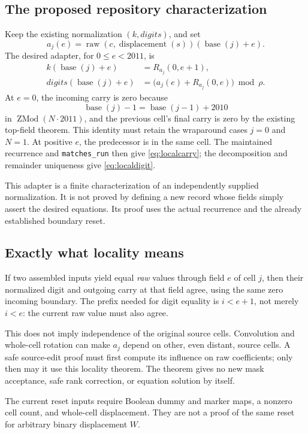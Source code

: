 \documentclass[11pt]{article}
\newcommand{\code}[1]{\nolinkurl{#1}}
\begin{document}
\subsection{The proposed repository characterization}
Keep the existing normalization \((k,\mathit{digits})\), and set
\[
 a_j(e)=\operatorname{raw}(c,\operatorname{displacement}(s))
          (\operatorname{base}(j)+e).
\]
The desired adapter, for \(0\le e<2011\), is
\begin{align}
 k(\operatorname{base}(j)+e)&=R_{a_j}(0,e+1),\label{eq:localcarry}\\
 \mathit{digits}(\operatorname{base}(j)+e)
   &=\bigl(a_j(e)+R_{a_j}(0,e)\bigr)\bmod\rho.\label{eq:localdigit}
\end{align}
At \(e=0\), the incoming carry is zero because
\[
 \operatorname{base}(j)-1=\operatorname{base}(j-1)+2010
\]
in \(\operatorname{ZMod}(N\cdot2011)\), and the previous cell's final carry
is zero by the existing top-field theorem. This identity must retain the
wraparound cases \(j=0\) and \(N=1\). At positive \(e\), the predecessor is
in the same cell. The maintained recurrence and \code{matches_run} then give
\eqref{eq:localcarry}; the decomposition and remainder uniqueness give
\eqref{eq:localdigit}.

This adapter is a finite characterization of an independently supplied
normalization. It is not proved by defining a new record whose fields simply
assert the desired equations. Its proof uses the actual recurrence and the
already established boundary reset.

\subsection{Exactly what locality means}
If two assembled inputs yield equal \emph{raw} values through field \(e\) of
cell \(j\), then their normalized digit and outgoing carry at that field agree,
using the same zero incoming boundary. The prefix needed for digit equality is
\(i<e+1\), not merely \(i<e\): the current raw value must also agree.

This does not imply independence of the original source cells. Convolution and
whole-cell rotation can make \(a_j\) depend on other, even distant, source
cells. A safe source-edit proof must first compute its influence on raw
coefficients; only then may it use this locality theorem. The theorem gives no
new mask acceptance, safe rank correction, or equation solution by itself.

The current reset inputs require Boolean dummy and marker maps, a nonzero cell
count, and whole-cell displacement. They are not a proof of the same reset for
arbitrary binary displacement \(W\).
\end{document}
